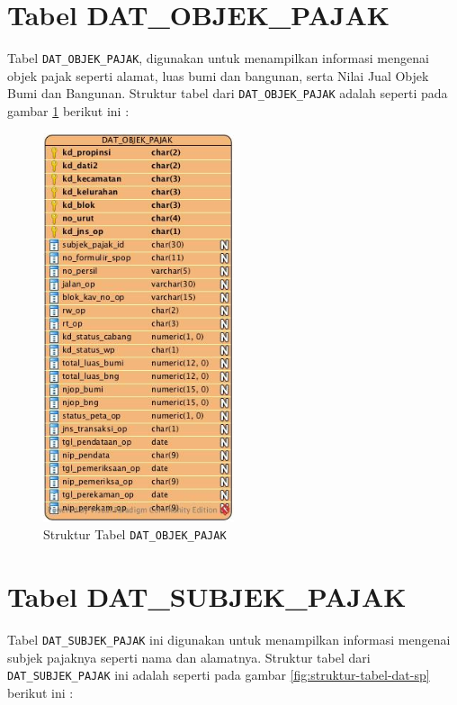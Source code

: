 \section{Tabel DAT\_OBJEK\_PAJAK}

Tabel \texttt{DAT\_OBJEK\_PAJAK}, digunakan untuk menampilkan informasi mengenai objek pajak seperti alamat, luas bumi dan bangunan, serta Nilai Jual Objek Bumi dan Bangunan. Struktur tabel dari \texttt{DAT\_OBJEK\_PAJAK} adalah seperti pada gambar \ref{fig:struktur-tabel-dat-op} berikut ini :

\begin{figure}[H]
	\centering
	\includegraphics[width=0.5\textwidth]{./resources/struktur-tabel-dat-op}
	\caption{Struktur Tabel \texttt{DAT\_OBJEK\_PAJAK}}
	\label{fig:struktur-tabel-dat-op}
\end{figure}

\section{Tabel DAT\_SUBJEK\_PAJAK}

Tabel \texttt{DAT\_SUBJEK\_PAJAK} ini digunakan untuk menampilkan informasi mengenai subjek pajaknya seperti nama dan alamatnya. Struktur tabel dari \texttt{DAT\_SUBJEK\_PAJAK} ini adalah seperti pada gambar \ref{fig:struktur-tabel-dat-sp} berikut ini :

